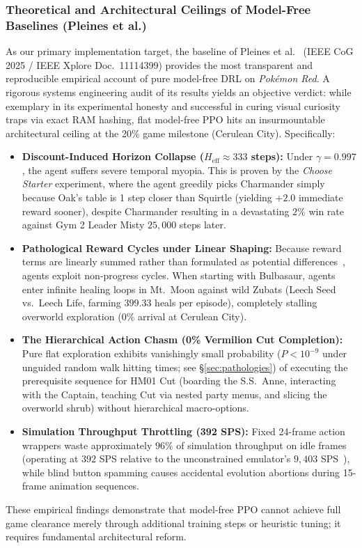 \documentclass[journal,10pt,twocolumn]{IEEEtran}
\begin{document}
\subsubsection{Theoretical and Architectural Ceilings of Model-Free Baselines (Pleines et al.)}
As our primary implementation target, the baseline of Pleines et al.~\cite{pleines2025pokemon} (IEEE CoG 2025 / IEEE Xplore Doc.~11114399) provides the most transparent and reproducible empirical account of pure model-free DRL on \textit{Pok{\'e}mon Red}. A rigorous systems engineering audit of its results yields an objective verdict: while exemplary in its experimental honesty and successful in curing visual curiosity traps via exact RAM hashing, flat model-free PPO hits an insurmountable architectural ceiling at the 20\% game milestone (Cerulean City). Specifically:
\begin{itemize}
    \item \textbf{Discount-Induced Horizon Collapse ($H_{\text{eff}} \approx 333$ steps):} Under $\gamma = 0.997$, the agent suffers severe temporal myopia. This is proven by the \textit{Choose Starter} experiment, where the agent greedily picks Charmander simply because Oak's table is 1 step closer than Squirtle (yielding $+2.0$ immediate reward sooner), despite Charmander resulting in a devastating $2\%$ win rate against Gym 2 Leader Misty $25{,}000$ steps later.
    \item \textbf{Pathological Reward Cycles under Linear Shaping:} Because reward terms are linearly summed rather than formulated as potential differences~\cite{ng1999shaping}, agents exploit non-progress cycles. When starting with Bulbasaur, agents enter infinite healing loops in Mt.~Moon against wild Zubats (Leech Seed vs.~Leech Life, farming $399.33$ heals per episode), completely stalling overworld exploration ($0\%$ arrival at Cerulean City).
    \item \textbf{The Hierarchical Action Chasm (0\% Vermilion Cut Completion):} Pure flat exploration exhibits vanishingly small probability ($P < 10^{-9}$ under unguided random walk hitting times; see \S\ref{sec:pathologies}) of executing the prerequisite sequence for HM01 Cut (boarding the S.S.~Anne, interacting with the Captain, teaching Cut via nested party menus, and slicing the overworld shrub) without hierarchical macro-options.
    \item \textbf{Simulation Throughput Throttling (392 SPS):} Fixed 24-frame action wrappers waste approximately $96\%$ of simulation throughput on idle frames (operating at $392$ SPS relative to the unconstrained emulator's $9{,}403$ SPS~\cite{pleines2025pokemon}), while blind button spamming causes accidental evolution abortions during 15-frame animation sequences.
\end{itemize}
These empirical findings demonstrate that model-free PPO cannot achieve full game clearance merely through additional training steps or heuristic tuning; it requires fundamental architectural reform.
\end{document}
